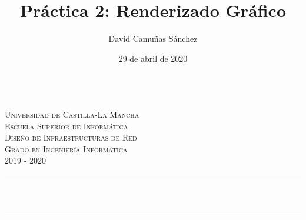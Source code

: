 \documentclass[11pt]{article}
\title{Práctica 2: Renderizado Gráfico}							%
\author{David Camuñas Sánchez}							%
\date{29 de abril de 2020}											%
\makeatletter
\newcommand{\subject}{Diseño de Infraestructuras de Red}						%
\newcommand{\course}{Grado en Ingeniería Informática}	%
\newcommand{\courseyear}{2019 - 2020} 					%
\let\thetitle\@title
\makeatother
\begin{document}

\begin{titlepage}
	\centering
	\begin{minipage}[t]{\textwidth}
		\hspace{\fill}
	\end{minipage}
	\\[2.25 cm]
    \textsc{\LARGE Universidad de Castilla-La Mancha}\\[1 cm]	%
    \textsc{\LARGE Escuela Superior de Informática}\\[2.0 cm]
	\textsc{\Large \subject}\\[0.5 cm]				%
	\textsc{\large \course \\ \courseyear}\\[2 cm]				%
	\rule{\linewidth}{0.2 mm} \\[0.4 cm]
	{ \huge \bfseries \thetitle}\\
	\rule{\linewidth}{0.2 mm} \\[2.5 cm]


\end{titlepage}
\end{document}
